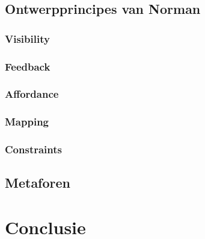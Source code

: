 \documentclass[11pt]{article}
\begin{document}
\subsection{Ontwerpprincipes van Norman}
\subsubsection{Visibility}
\subsubsection{Feedback}
\subsubsection{Affordance}
\subsubsection{Mapping}
\subsubsection{Constraints}
\subsection{Metaforen}
\newpage


\section{Conclusie}

\newpage
\end{document}
